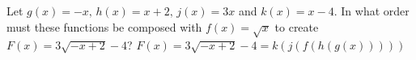{Let $g(x) = -x, \, h(x) = x + 2, \, j(x) = 3x$ and $k(x) = x - 4$.  In what order must these functions be composed with $f(x) = \sqrt{x}$ to create $F(x) = 3\sqrt{-x + 2} - 4$?}
{$F(x) = 3\sqrt{-x + 2} - 4 = k(j(f(h(g(x)))))$}
